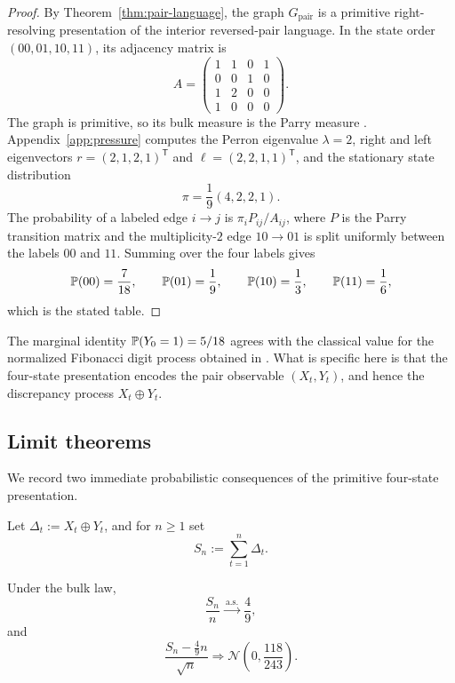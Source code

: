 \begin{proof}
By Theorem~\ref{thm:pair-language}, the graph \(G_{\mathrm{pair}}\) is a primitive right-resolving presentation of the interior reversed-pair language. In the state order \((00,01,10,11)\), its adjacency matrix is
\[
A=\begin{pmatrix}
1&1&0&1\\
0&0&1&0\\
1&2&0&0\\
1&0&0&0
\end{pmatrix}.
\]
The graph is primitive, so its bulk measure is the Parry measure \cite{Parry1964,ParryPollicott1990,Ruelle2004}. Appendix~\ref{app:pressure} computes the Perron eigenvalue \(\lambda=2\), right and left eigenvectors \(r=(2,1,2,1)^{\mathsf T}\) and \(\ell=(2,2,1,1)^{\mathsf T}\), and the stationary state distribution
\[
\pi=\frac{1}{9}(4,2,2,1).
\]
The probability of a labeled edge \(i\to j\) is \(\pi_iP_{ij}/A_{ij}\), where \(P\) is the Parry transition matrix and the multiplicity-\(2\) edge \(10\to 01\) is split uniformly between the labels \(00\) and \(11\). Summing over the four labels gives
\[
\mathbb{P}(00)=\frac{7}{18},\qquad
\mathbb{P}(01)=\frac{1}{9},\qquad
\mathbb{P}(10)=\frac{1}{3},\qquad
\mathbb{P}(11)=\frac{1}{6},
\]
which is the stated table.
\end{proof}

The marginal identity \(\mathbb{P}(Y_0=1)=5/18\) agrees with the classical value for the normalized Fibonacci digit process obtained in \cite{AlexanderZagier1991,SidorovVershik1998,KemptonDigits2014,BezhaevaOseledets2007,BezhaevaOseledets2010}. What is specific here is that the four-state presentation encodes the pair observable \((X_t,Y_t)\), and hence the discrepancy process \(X_t\oplus Y_t\).

\subsection{Limit theorems}
\label{subsec:lln-clt}

We record two immediate probabilistic consequences of the primitive four-state presentation.

Let \(\Delta_t:=X_t\oplus Y_t\), and for \(n\ge 1\) set
\[
S_n:=\sum_{t=1}^n \Delta_t.
\]

\begin{corollary}\label{thm:llnclt}
Under the bulk law,
\[
\frac{S_n}{n}\xrightarrow{\ \mathrm{a.s.}\ }\frac{4}{9},
\]
and
\[
\frac{S_n-\frac{4}{9}n}{\sqrt n}\Rightarrow \mathcal{N}\!\left(0,\frac{118}{243}\right).
\]
\end{corollary}

